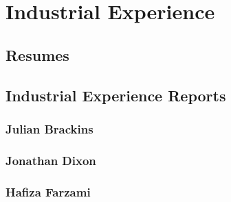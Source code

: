 
\chapter{Industrial Experience}

\section{Resumes}


%     
%     
%     

\section{Industrial Experience Reports}

\subsection{Julian Brackins}


\subsection{Jonathan Dixon}


\subsection{Hafiza Farzami}


